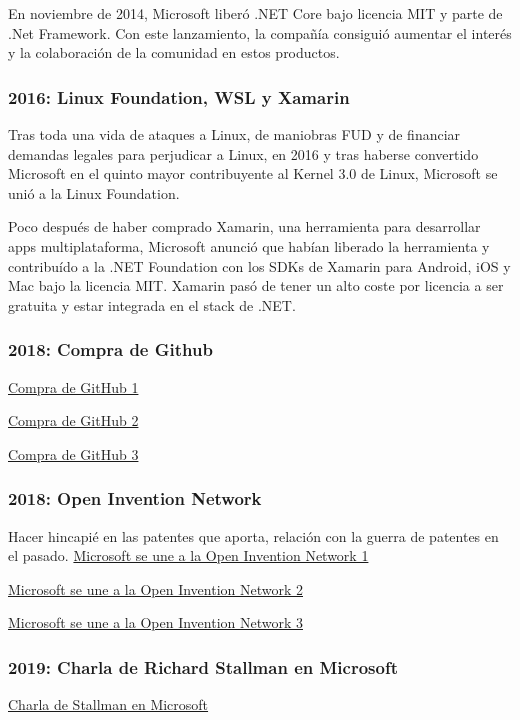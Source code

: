 En noviembre de 2014, Microsoft liberó .NET Core bajo licencia MIT y parte de .Net Framework. Con este lanzamiento, la compañía consiguió aumentar el interés y la colaboración de la comunidad en estos productos.\cite{arstechnica_2014:microsoft_open_sources_.NET}

\subsubsection{2016: Linux Foundation, WSL y Xamarin}
Tras toda una vida de ataques a Linux, de maniobras FUD y de financiar demandas legales para perjudicar a Linux, en 2016 y tras haberse convertido Microsoft en el quinto mayor contribuyente al Kernel 3.0 de Linux\cite{zdnet_2011:microsoft_contributes_linux}, Microsoft se unió a la Linux Foundation.\cite{arstechnica_2016:microsoft_joins_linux_foundation}

Poco después de haber comprado Xamarin, una herramienta para desarrollar apps multiplataforma, Microsoft anunció que habían liberado la herramienta y contribuído a la .NET Foundation con los SDKs de Xamarin para Android, iOS y Mac bajo la licencia MIT. Xamarin pasó de tener un alto coste por licencia a ser gratuita y estar integrada en el stack de .NET. \cite{genbeta_2016:microsoft_xamarin} \cite{petri_2016:microsoft_xamarin}

\subsubsection{2018: Compra de Github}
\href{https://www.xataka.com/aplicaciones/oficial-microsoft-compra-github-7-500-millones-dolares}{Compra de GitHub 1}

\href{https://www.elconfidencial.com/tecnologia/2018-06-04/microsoft-ahora-ama-el-software-libre-compra-la-startup-github-por-7-500-millones_1573704/}{Compra de GitHub 2}

\href{https://www.xataka.com/aplicaciones/microsoft-punto-adquirir-github-desarrolladores-desarrolladores-desarrolladores}{Compra de GitHub 3}

\subsubsection{2018: Open Invention Network}
Hacer hincapié en las patentes que aporta, relación con la guerra de patentes en el pasado.
\href{https://azure.microsoft.com/en-us/blog/microsoft-joins-open-invention-network-to-help-protect-linux-and-open-source/}{Microsoft se une a la Open Invention Network 1}

\href{https://www.zdnet.com/article/what-does-microsoft-joining-the-open-invention-network-mean-for-you/}{Microsoft se une a la Open Invention Network 2}

\href{https://www.muycomputerpro.com/2018/10/10/microsoft-se-une-a-open-invention-network}{Microsoft se une a la Open Invention Network 3}

\subsubsection{2019: Charla de Richard Stallman en Microsoft}
\href{https://stallman.org/articles/microsoft-talk.html}{Charla de Stallman en Microsoft}
